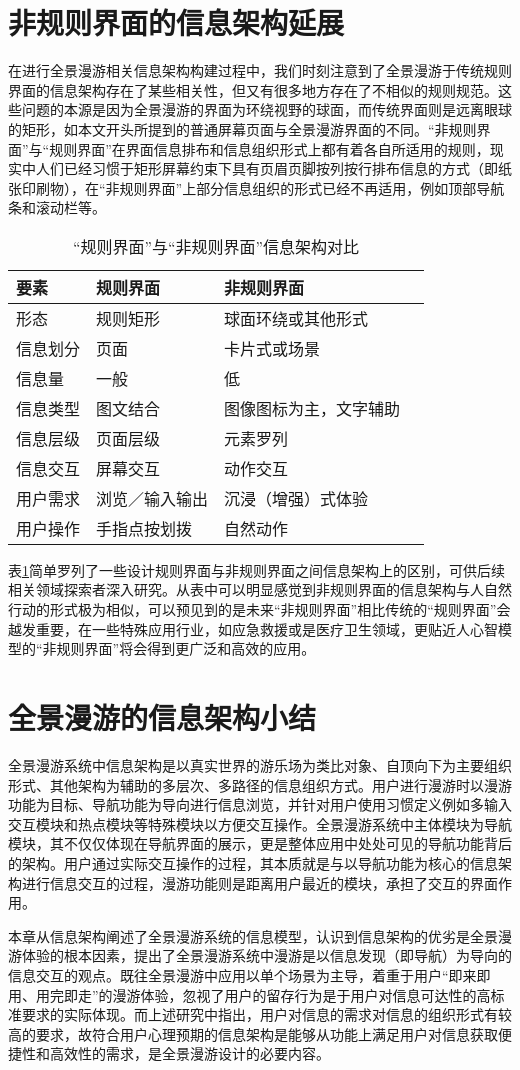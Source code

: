 \section{非规则界面的信息架构延展}
在进行全景漫游相关信息架构构建过程中，我们时刻注意到了全景漫游于传统规则界面的信息架构存在了某些相关性，但又有很多地方存在了不相似的规则规范。这些问题的本源是因为全景漫游的界面为环绕视野的球面，而传统界面则是远离眼球的矩形，如本文开头所提到的普通屏幕页面与全景漫游界面的不同。“非规则界面”与“规则界面”在界面信息排布和信息组织形式上都有着各自所适用的规则，现实中人们已经习惯于矩形屏幕约束下具有页眉页脚按列按行排布信息的方式（即纸张印刷物），在“非规则界面”上部分信息组织的形式已经不再适用，例如顶部导航条和滚动栏等。

\begin{table}[htbp]
\centering
\caption{“规则界面”与“非规则界面”信息架构对比}
\vskip 5pt
\begin{tabular}{llll}
\toprule
要素 & 规则界面 & 非规则界面 \\
\midrule
形态 & 规则矩形 & 球面环绕或其他形式 \\
信息划分 & 页面 & 卡片式或场景 \\
信息量 & 一般 & 低 \\
信息类型 & 图文结合 & 图像图标为主，文字辅助 \\
信息层级 & 页面层级 & 元素罗列 \\
信息交互 & 屏幕交互 & 动作交互 \\
用户需求 & 浏览／输入输出 & 沉浸（增强）式体验 \\
用户操作 & 手指点按划拨 & 自然动作 \\
\bottomrule
\end{tabular}
\label{tab:irregular}
\vskip 15pt
\end{table}

表\ref{tab:irregular}简单罗列了一些设计规则界面与非规则界面之间信息架构上的区别，可供后续相关领域探索者深入研究。从表中可以明显感觉到非规则界面的信息架构与人自然行动的形式极为相似，可以预见到的是未来“非规则界面”相比传统的“规则界面”会越发重要，在一些特殊应用行业，如应急救援或是医疗卫生领域，更贴近人心智模型的“非规则界面”将会得到更广泛和高效的应用。

\section{全景漫游的信息架构小结}
全景漫游系统中信息架构是以真实世界的游乐场为类比对象、自顶向下为主要组织形式、其他架构为辅助的多层次、多路径的信息组织方式。用户进行漫游时以漫游功能为目标、导航功能为导向进行信息浏览，并针对用户使用习惯定义例如多输入交互模块和热点模块等特殊模块以方便交互操作。全景漫游系统中主体模块为导航模块，其不仅仅体现在导航界面的展示，更是整体应用中处处可见的导航功能背后的架构。用户通过实际交互操作的过程，其本质就是与以导航功能为核心的信息架构进行信息交互的过程，漫游功能则是距离用户最近的模块，承担了交互的界面作用。

本章从信息架构阐述了全景漫游系统的信息模型，认识到信息架构的优劣是全景漫游体验的根本因素，提出了全景漫游系统中漫游是以信息发现（即导航）为导向的信息交互的观点。既往全景漫游中应用以单个场景为主导，着重于用户“即来即用、用完即走”的漫游体验，忽视了用户的留存行为是于用户对信息可达性的高标准要求的实际体现。而上述研究中指出，用户对信息的需求对信息的组织形式有较高的要求，故符合用户心理预期的信息架构是能够从功能上满足用户对信息获取便捷性和高效性的需求，是全景漫游设计的必要内容。